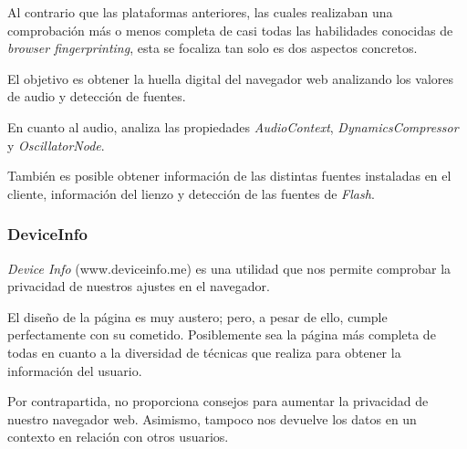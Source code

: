 Al contrario que las plataformas anteriores, las cuales realizaban una comprobación más o menos completa de casi todas las habilidades conocidas de \textit{browser fingerprinting}, esta se focaliza tan solo es dos aspectos concretos. \par 

El objetivo es obtener la huella digital del navegador web analizando los valores de audio y detección de fuentes. \par 

En cuanto al audio, analiza las propiedades \textit{AudioContext}, \textit{DynamicsCompressor} y \textit{OscillatorNode}. \par 

También es posible obtener información de las distintas fuentes instaladas en el cliente, información del lienzo y detección de las fuentes de \textit{Flash}. \par 

\subsubsection{DeviceInfo}

\textit{Device Info} (www.deviceinfo.me) es una utilidad que nos permite comprobar la privacidad de nuestros ajustes en el navegador. \par

El diseño de la página es muy austero; pero, a pesar de ello, cumple perfectamente con su cometido. Posiblemente sea la página más completa de todas en cuanto a la diversidad de técnicas que realiza para obtener la información del usuario. \par

Por contrapartida, no proporciona consejos para aumentar la privacidad de nuestro navegador web. Asimismo, tampoco nos devuelve los datos en un contexto en relación con otros usuarios. \par

